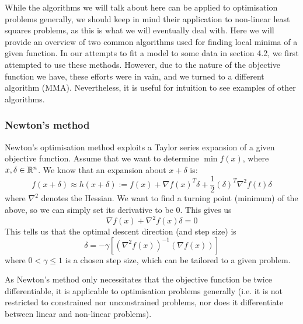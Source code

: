 While the algorithms we will talk about here can be applied to optimisation problems generally, we should 
keep in mind their application to non-linear least squares problems, as this is what we will eventually deal with. 
Here we will provide an overview of two common algorithms 
used for finding local minima of a given function. In our attempts to fit a model to some data in section 4.2, we first 
attempted to use these methods. However, due to the nature of the objective function we have, these efforts were in vain, and 
we turned to a different algorithm (MMA). Nevertheless, it is useful for intuition to see examples of other algorithms.

\subsubsection{Newton's method}
Newton's optimisation method exploits a Taylor series expansion of a given objective function. Assume that we 
want to determine $\min f(x)$, where $x,\delta \in \mathbb{R}^n$. We know that an expansion about $x + \delta$ is:
\begin{equation*}
    f(x+\delta) \approx h(x+\delta) := f(x) + \nabla f(x)^{T} \delta + \frac{1}{2}(\delta)^{T} \nabla^2 f(t) \delta
\end{equation*}
where $\nabla^2$ denotes the Hessian. We want to find a turning point (minimum) of the above, so we can simply set its 
derivative to be $0$. This gives us
\begin{equation*}
    \nabla f(x) + \nabla^2 f(x) \delta = 0
\end{equation*}
This tells us that the optimal descent direction (and step size) is
\begin{equation*}
    \delta = - \gamma \left [  (\nabla^2 f(x))^{-1} (\nabla f(x)) \right ]
\end{equation*}
where $0 < \gamma \le 1$ is a chosen step size, which can be tailored to a given problem. 

\begin{remark}
    As Newton's method only necessitates that the objective function be twice differentiable, it is applicable to 
    optimisation problems generally (i.e. it is not restricted to constrained nor unconstrained problems, nor does it differentiate 
    between linear and non-linear problems).
\end{remark}

